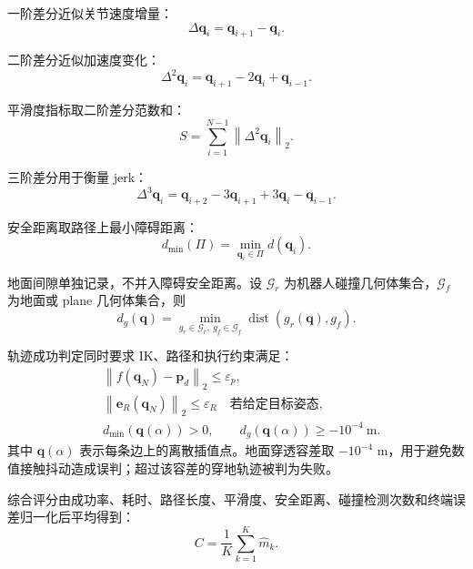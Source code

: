 \documentclass[UTF8,zihao=-4]{ctexart}
\newcommand{\norm}[1]{\left\lVert #1 \right\rVert}
\begin{document}
一阶差分近似关节速度增量：
\begin{equation}
  \Delta\bm q_i=\bm q_{i+1}-\bm q_i .
  \label{eq:first-diff}
\end{equation}

二阶差分近似加速度变化：
\begin{equation}
  \Delta^2\bm q_i=\bm q_{i+1}-2\bm q_i+\bm q_{i-1}.
  \label{eq:second-diff}
\end{equation}

平滑度指标取二阶差分范数和：
\begin{equation}
  S=\sum_{i=1}^{N-1}\norm{\Delta^2\bm q_i}_2 .
  \label{eq:smoothness}
\end{equation}

三阶差分用于衡量 jerk：
\begin{equation}
  \Delta^3\bm q_i
  =
  \bm q_{i+2}-3\bm q_{i+1}+3\bm q_i-\bm q_{i-1}.
  \label{eq:jerk}
\end{equation}

安全距离取路径上最小障碍距离：
\begin{equation}
  d_{\min}(\Pi)=\min_{\bm q_i\in\Pi}d(\bm q_i).
  \label{eq:min-distance}
\end{equation}

地面间隙单独记录，不并入障碍安全距离。设 $\mathcal G_r$ 为机器人碰撞几何体集合，$\mathcal G_f$ 为地面或 plane 几何体集合，则
\begin{equation}
  d_g(\bm q)
  =
  \min_{g_r\in\mathcal G_r,\ g_f\in\mathcal G_f}
  \operatorname{dist}(g_r(\bm q),g_f).
  \label{eq:ground-clearance}
\end{equation}

轨迹成功判定同时要求 IK、路径和执行约束满足：
\begin{equation}
  \begin{aligned}
  &\norm{f(\bm q_N)-\bm p_d}_2\leq \varepsilon_p,\\
  &\norm{\bm e_R(\bm q_N)}_2\leq \varepsilon_R\quad\text{若给定目标姿态},\\
  &d_{\min}(\bm q(\alpha))>0,\qquad
  d_g(\bm q(\alpha))\geq -10^{-4}\ \mathrm{m}.
  \end{aligned}
  \label{eq:success-criteria}
\end{equation}
其中 $\bm q(\alpha)$ 表示每条边上的离散插值点。地面穿透容差取 $-10^{-4}$ m，用于避免数值接触抖动造成误判；超过该容差的穿地轨迹被判为失败。

综合评分由成功率、耗时、路径长度、平滑度、安全距离、碰撞检测次数和终端误差归一化后平均得到：
\begin{equation}
  C=\frac{1}{K}\sum_{k=1}^{K}\hat m_k .
  \label{eq:composite}
\end{equation}
\end{document}
